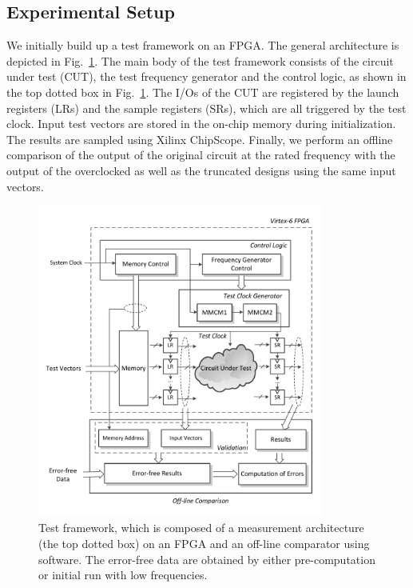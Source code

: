 \documentclass[prodmode,acmtrets]{acmsmall} %
\begin{document}
\subsection{Experimental Setup} \label{sub:experimental_setup}
We initially build up a test framework on an FPGA. The general architecture is depicted in Fig.~\ref{Test Framework}. The main body of the test framework consists of the circuit under test (CUT), the test frequency generator and the control logic, as shown in the top dotted box in Fig.~\ref{Test Framework}. The I/Os of the CUT are registered by the launch registers (LRs) and the sample registers (SRs), which are all triggered by the test clock. Input test vectors are stored in the on-chip memory during initialization. The results are sampled using Xilinx ChipScope. Finally, we perform an offline comparison of the output of the original circuit at the rated frequency with the output of the overclocked as well as the truncated designs using the same input vectors.
%
\begin{figure}[htbp]
  \centering
  \vspace{-3.5ex}
  \includegraphics[width=3.7in]{./Figures/TestFramework.pdf}
  \vspace{-1.5ex}
  \caption{Test framework, which is composed of a measurement architecture (the top dotted box) on an FPGA and an off-line comparator using software. The error-free data are obtained by either pre-computation or initial run with low frequencies.}
  \label{Test Framework}
  \vspace{-1.5ex}
\end{figure}
\end{document}
